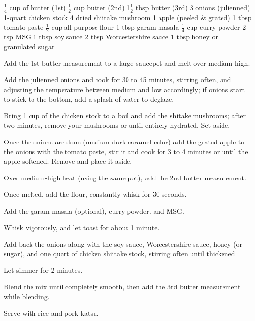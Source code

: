 \dishtype{\vegetarian}
\begin{ingreds}
    $\frac{1}{4}$ cup of butter (1st)
	$\frac{1}{2}$ cup butter (2nd)
	1$\frac{1}{2}$ tbsp butter (3rd)
	3 onions (julienned)
	1-quart chicken stock
	4 dried shiitake mushroom 
	1 apple (peeled \& grated)
	1 tbsp tomato paste
	$\frac{1}{2}$ cup all-purpose flour
	1 tbsp garam masala
	$\frac{1}{4}$ cup curry powder
	2 tsp MSG
	1 tbsp soy sauce
	2 tbsp Worcestershire sauce
	1 tbsp honey or granulated sugar        
\end{ingreds}
\begin{method}
    Add the 1st butter measurement to a large saucepot and melt over medium-high.\par
    Add the julienned onions and cook for 30 to 45 minutes, stirring often, and adjusting the temperature between medium and low accordingly; if onions start to stick to the bottom, add a splash of water to deglaze.\par
	Bring 1 cup of the chicken stock to a boil and add the shitake mushrooms; after two minutes, remove your mushrooms or until entirely hydrated. Set aside.\par
    Once the onions are done (medium-dark caramel color) add the grated apple to the onions with the tomato paste, stir it and cook for 3 to 4 minutes or until the apple softened. Remove and place it aside.\par
	Over medium-high heat (using the same pot),  add the 2nd butter measurement.\par
    Once melted, add the flour, constantly whisk for 30 seconds.\par
    Add the garam masala (optional), curry powder, and MSG.\par
    Whisk vigorously, and let toast for about 1 minute.\par
	Add back the onions along with the soy sauce, Worcestershire sauce, honey (or sugar), and one quart of chicken shiitake stock, stirring often until thickened\par
    Let simmer for 2 minutes.\par
	Blend the mix until completely smooth, then add the 3rd butter measurement while blending.\par
    Serve with rice and pork katsu.
\end{method}